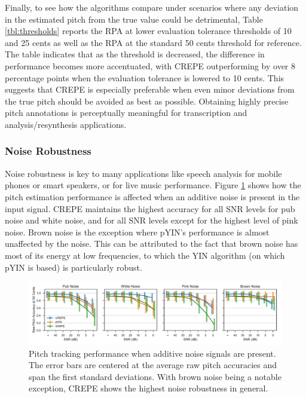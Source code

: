 Finally, to see how the algorithms compare under scenarios where any deviation in the estimated pitch from the true value could be detrimental, Table \ref{tbl:thresholds} reports the RPA at lower evaluation tolerance thresholds of 10 and 25 cents as well as the RPA at the standard 50 cents threshold for reference.
The table indicates that as the threshold is decreased, the difference in performance becomes more accentuated, with CREPE 
outperforming by over 8 percentage points when the evaluation tolerance is lowered to 10 cents.
This suggests that CREPE is especially preferable when even minor deviations from the true pitch should be avoided as best as possible.
Obtaining highly precise pitch annotations is perceptually meaningful for transcription and analysis/resynthesis applications.


\subsubsection{Noise Robustness}


Noise robustness is key to many applications like speech analysis for mobile phones or smart speakers, or for live music performance.
Figure \ref{fig:noise} shows how the pitch estimation performance is affected when an additive noise is present in the input signal.
CREPE maintains the highest accuracy for all SNR levels for pub noise and white noise, and for all SNR levels except for the highest level of pink noise.
Brown noise is the exception where pYIN's performance is almost unaffected by the noise.
This can be attributed to the fact that brown noise has most of its energy at low frequencies, to which the YIN algorithm (on which pYIN is based) is particularly robust.

\begin{figure}
	\includegraphics[width=\textwidth]{noise.pdf}
	\caption{Pitch tracking performance when additive noise signals are present. The error bars are centered at the average raw pitch accuracies and span the first standard deviations. With brown noise being a notable exception, CREPE shows the highest noise robustness in general. }
	\label{fig:noise}
\end{figure}

